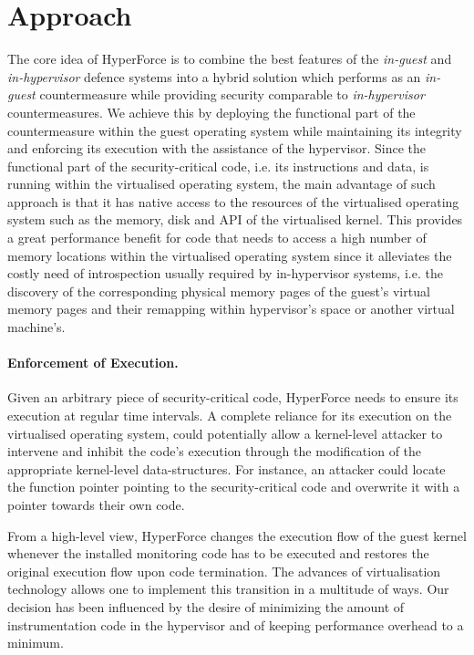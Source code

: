 \section{Approach}\label{hf:approach}
The core idea of HyperForce is to combine the best features of the \textit{in-guest} and \textit{in-hypervisor} defence systems into a hybrid solution which performs as an \textit{in-guest} countermeasure while providing security comparable to \textit{in-hypervisor} countermeasures. 
We achieve this by deploying the functional part of the countermeasure within the guest operating system while maintaining its integrity and enforcing its execution with the assistance of the hypervisor. Since the functional part of the security-critical code, i.e. its instructions and data, is running within the virtualised operating system, the main advantage of such approach is that it has native access to the resources of the virtualised operating system such as the memory, disk and API of the virtualised kernel. 
This provides a great performance benefit for code that needs to access a high number of memory locations within the virtualised operating system since it alleviates the costly need of introspection usually required by in-hypervisor systems, i.e. the discovery of the corresponding physical memory pages of the guest's virtual memory pages and their remapping within hypervisor's space or another virtual machine's. 

\paragraph{Enforcement of Execution.}
Given an arbitrary piece of security-critical code, HyperForce needs to ensure its execution at regular time intervals. A complete reliance for its execution on the virtualised operating system, could potentially allow a kernel-level attacker to intervene and inhibit the code's execution through the modification of the appropriate kernel-level data-structures. For instance, an attacker could locate the function pointer pointing to the security-critical code and overwrite it with a pointer towards their own code.

From a high-level view, HyperForce changes the execution flow of the guest kernel whenever the installed monitoring code has to be executed and restores the original execution flow upon code termination. 
The advances of virtualisation technology allows one to implement this transition in a multitude of ways. Our decision has been influenced by the desire of minimizing the amount of instrumentation code in the hypervisor and of keeping performance overhead to a minimum.

